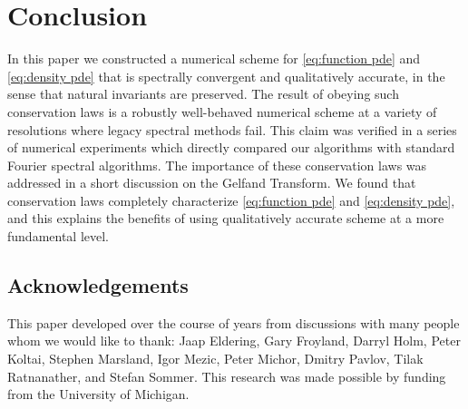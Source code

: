 \documentclass[final,leqno]{siamart}
\begin{document}
\section{Conclusion}

In this paper we constructed a numerical scheme for \eqref{eq:function pde} and \eqref{eq:density pde} that is spectrally convergent and qualitatively accurate, in the sense that natural invariants are preserved.
The result of obeying such conservation laws is a robustly well-behaved numerical scheme at a variety of resolutions where legacy spectral methods fail.
This claim was verified in a series of numerical experiments which directly compared our algorithms with standard Fourier spectral algorithms.
The importance of these conservation laws was addressed in a short discussion on the Gelfand Transform.
We found that conservation laws completely characterize \eqref{eq:function pde} and \eqref{eq:density pde}, and this explains the benefits of using qualitatively accurate scheme at a more fundamental level.


\subsection{Acknowledgements}
This paper developed over the course of years from discussions with many people whom we would like to thank: Jaap Eldering, Gary Froyland,
 	Darryl Holm, Peter Koltai, Stephen Marsland, Igor Mezic, Peter Michor, Dmitry Pavlov, Tilak Ratnanather, and Stefan Sommer. 
This research was made possible by funding from the University of Michigan.
\end{document}
